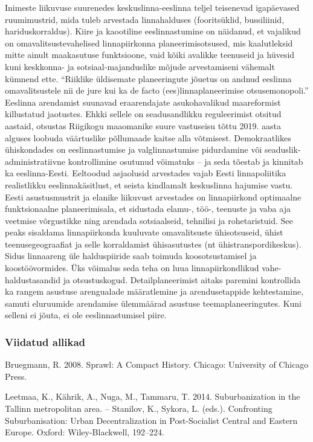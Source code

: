 \documentclass[estonian,]{article}
\begin{document}
Inimeste liikuvuse suurenedes keskuslinna-eeslinna teljel teisenevad igapäevased ruumimustrid, mida tuleb arvestada linnahalduses (fooritsüklid, bussiliinid, hariduskorraldus). Kiire ja kaootiline eeslinnastumine on näidanud, et vajalikud on omavalitsustevahelised linnapiirkonna planeerimisotsused, mis kaalutleksid mitte ainult maakasutuse funktsioone, vaid kõiki avalikke teenuseid ja hüvesid kuni keskkonna- ja sotsiaal-majanduslike mõjude arvestamiseni vähemalt kümnend ette. ``Riiklike üldisemate planeeringute jõuetus on andnud eeslinna omavalitsustele nii de jure kui ka de facto (ees)linnaplaneerimise otsusemonopoli.'' Eeslinna arendamist suunavad eraarendajate asukohavalikud maareformist killustatud jaotustes. Ehkki sellele on seadusandlikku reguleerimist otsitud aastaid, otsustas Riigikogu maaomanike suure vastuseisu tõttu 2019. aasta alguses loobuda väärtuslike põllumaade kaitse alla võtmisest. Demokraatlikes ühiskondades on eeslinnastumise ja valglinnastumise pidurdamine või seaduslik-administratiivne kontrollimine osutunud võimatuks -- ja seda tõestab ja kinnitab ka eeslinna-Eesti. Eeltoodud asjaolusid arvestades vajab Eesti linnapoliitika realistlikku eeslinnakäsitlust, et seista kindlamalt keskuslinna hajumise vastu. Eesti asustusmustrit ja elanike liikuvust arvestades on linnapiirkond optimaalne funktsionaalne planeerimisala, et sidustada elamu-, töö-, teenuste ja vaba aja veetmise võrgustikke ning arendada sotsiaalseid, tehnilisi ja rohetaristuid. See peaks sisaldama linnapiirkonda kuuluvate omavalitsuste ühisotsuseid, ühist teenusegeograafiat ja selle korraldamist ühisasutustes (nt ühistranspordikeskus). Sidus linnaareng üle halduspiiride saab toimuda koosotsustamisel ja koostöövormides. Üks võimalus seda teha on luua linnapiirkondlikud vahe-haldustasandid ja otsustuskogud. Detailplaneerimist aitaks paremini kontrollida ka rangem asustuse arengualade määratlemine ja arendusetappide kehtestamine, samuti eluruumide arendamise ülemmäärad asustuse teemaplaneeringutes. Kuni selleni ei jõuta, ei ole eeslinnastumisel piire.

\hypertarget{viidatud-allikad-3}{%
\subsubsection*{Viidatud allikad}\label{viidatud-allikad-3}}

Bruegmann, R. 2008. Sprawl: A Compact History. Chicago: University of Chicago Press.

Leetmaa, K., Kährik, A., Nuga, M., Tammaru, T. 2014. Suburbanization in the Tallinn metropolitan area. -- Stanilov, K., Sykora, L. (eds.). Confronting Suburbanisation: Urban Decentralization in Post-Socialist Central and Eastern Europe. Oxford: Wiley-Blackwell, 192--224.
\end{document}
